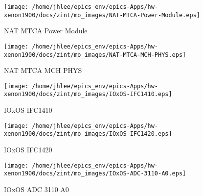 \noindent
\vspace{1.4cm}
\begin{minipage}{.2\textwidth}
\begin{center}
\texttt{[image: /home/jhlee/epics\_env/epics-Apps/hw-xenon1900/docs/zint/mo\_images/NAT-MTCA-Power-Module.eps]}
\end{center}
\end{minipage}
\begin{minipage}{.7\textwidth}
NAT MTCA Power Module
\end{minipage}


\noindent
\vspace{1.4cm}
\begin{minipage}{.2\textwidth}
\begin{center}
\texttt{[image: /home/jhlee/epics\_env/epics-Apps/hw-xenon1900/docs/zint/mo\_images/NAT-MTCA-MCH-PHYS.eps]}
\end{center}
\end{minipage}
\begin{minipage}{.7\textwidth}
NAT MTCA MCH PHYS
\end{minipage}


\noindent
\vspace{1.4cm}
\begin{minipage}{.2\textwidth}
\begin{center}
\texttt{[image: /home/jhlee/epics\_env/epics-Apps/hw-xenon1900/docs/zint/mo\_images/IOxOS-IFC1410.eps]}
\end{center}
\end{minipage}
\begin{minipage}{.7\textwidth}
IOxOS IFC1410
\end{minipage}


\noindent
\vspace{1.4cm}
\begin{minipage}{.2\textwidth}
\begin{center}
\texttt{[image: /home/jhlee/epics\_env/epics-Apps/hw-xenon1900/docs/zint/mo\_images/IOxOS-IFC1420.eps]}
\end{center}
\end{minipage}
\begin{minipage}{.7\textwidth}
IOxOS IFC1420
\end{minipage}


\noindent
\vspace{1.4cm}
\begin{minipage}{.2\textwidth}
\begin{center}
\texttt{[image: /home/jhlee/epics\_env/epics-Apps/hw-xenon1900/docs/zint/mo\_images/IOxOS-ADC-3110-A0.eps]}
\end{center}
\end{minipage}
\begin{minipage}{.7\textwidth}
IOxOS ADC 3110 A0
\end{minipage}


